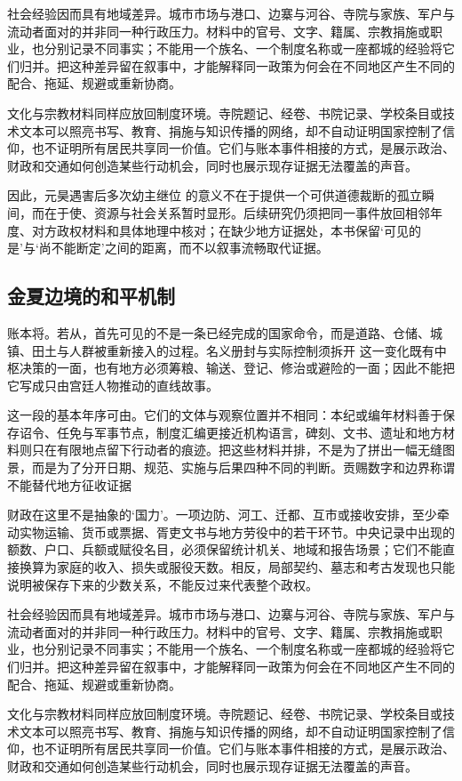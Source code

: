 社会经验因而具有地域差异。城市市场与港口、边寨与河谷、寺院与家族、军户与流动者面对的并非同一种行政压力。材料中的官号、文字、籍属、宗教捐施或职业，也分别记录不同事实；不能用一个族名、一个制度名称或一座都城的经验将它们归并。把这种差异留在叙事中，才能解释同一政策为何会在不同地区产生不同的配合、拖延、规避或重新协商。

文化与宗教材料同样应放回制度环境。寺院题记、经卷、书院记录、学校条目或技术文本可以照亮书写、教育、捐施与知识传播的网络，却不自动证明国家控制了信仰，也不证明所有居民共享同一价值。它们与账本事件相接的方式，是展示政治、财政和交通如何创造某些行动机会，同时也展示现存证据无法覆盖的声音。

因此，元昊遇害后多次幼主继位 的意义不在于提供一个可供道德裁断的孤立瞬间，而在于使、资源与社会关系暂时显形。后续研究仍须把同一事件放回相邻年度、对方政权材料和具体地理中核对；在缺少地方证据处，本书保留‘可见的是’与‘尚不能断定’之间的距离，而不以叙事流畅取代证据。

\subsection{金夏边境的和平机制}

账本将。若从，首先可见的不是一条已经完成的国家命令，而是道路、仓储、城镇、田土与人群被重新接入的过程。名义册封与实际控制须拆开 这一变化既有中枢决策的一面，也有地方必须筹粮、输送、登记、修治或避险的一面；因此不能把它写成只由宫廷人物推动的直线故事。

这一段的基本年序可由。它们的文体与观察位置并不相同：本纪或编年材料善于保存诏令、任免与军事节点，制度汇编更接近机构语言，碑刻、文书、遗址和地方材料则只在有限地点留下行动者的痕迹。把这些材料并排，不是为了拼出一幅无缝图景，而是为了分开日期、规范、实施与后果四种不同的判断。贡赐数字和边界称谓不能替代地方征收证据

财政在这里不是抽象的‘国力’。一项边防、河工、迁都、互市或接收安排，至少牵动实物运输、货币或票据、胥吏文书与地方劳役中的若干环节。中央记录中出现的额数、户口、兵额或赋役名目，必须保留统计机关、地域和报告场景；它们不能直接换算为家庭的收入、损失或服役天数。相反，局部契约、墓志和考古发现也只能说明被保存下来的少数关系，不能反过来代表整个政权。

社会经验因而具有地域差异。城市市场与港口、边寨与河谷、寺院与家族、军户与流动者面对的并非同一种行政压力。材料中的官号、文字、籍属、宗教捐施或职业，也分别记录不同事实；不能用一个族名、一个制度名称或一座都城的经验将它们归并。把这种差异留在叙事中，才能解释同一政策为何会在不同地区产生不同的配合、拖延、规避或重新协商。

文化与宗教材料同样应放回制度环境。寺院题记、经卷、书院记录、学校条目或技术文本可以照亮书写、教育、捐施与知识传播的网络，却不自动证明国家控制了信仰，也不证明所有居民共享同一价值。它们与账本事件相接的方式，是展示政治、财政和交通如何创造某些行动机会，同时也展示现存证据无法覆盖的声音。

